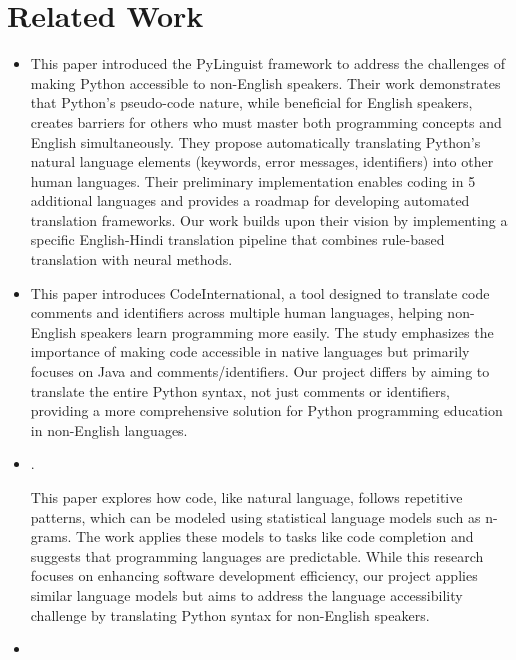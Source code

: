 \documentclass[11pt,a4paper]{article}
\begin{document}
\section{Related Work}
\begin{itemize}
  \item \cite{otten-etal-23-unipy}
  
  This paper introduced the PyLinguist framework to address the challenges of making Python accessible to non-English speakers. Their work demonstrates that Python's pseudo-code nature, while beneficial for English speakers, creates barriers for others who must master both programming concepts and English simultaneously. They propose automatically translating Python's natural language elements (keywords, error messages, identifiers) into other human languages. Their preliminary implementation enables coding in 5 additional languages and provides a roadmap for developing automated translation frameworks. Our work builds upon their vision by implementing a specific English-Hindi translation pipeline that combines rule-based translation with neural methods.
  \item \cite{Piech2019HumanLI}
  
  This paper introduces CodeInternational, a tool designed to translate code comments and identifiers across multiple human languages, helping non-English speakers learn programming more easily. The study emphasizes the importance of making code accessible in native languages but primarily focuses on Java and comments/identifiers. Our project differs by aiming to translate the entire Python syntax, not just comments or identifiers, providing a more comprehensive solution for Python programming education in non-English languages.
  
  \item \cite{10.5555/2819009.2819097}. 
  
  This paper explores how code, like natural language, follows repetitive patterns, which can be modeled using statistical language models such as n-grams. The work applies these models to tasks like code completion and suggests that programming languages are predictable. While this research focuses on enhancing software development efficiency, our project applies similar language models but aims to address the language accessibility challenge by translating Python syntax for non-English speakers. 
  
  \item \cite{10.1145/3196398.3196402}
  

\end{itemize}
\end{document}
